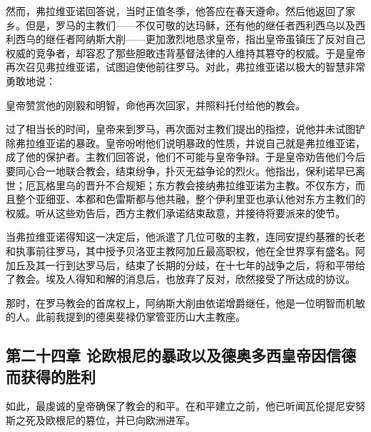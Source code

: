 然而，弗拉维亚诺回答说，当时正值冬季，他答应在春天遵命。然后他返回了家乡。但是，罗马的主教们——不仅可敬的达玛稣，还有他的继任者西利西乌以及西利西乌的继任者阿纳斯大削——更加激烈地恳求皇帝，指出皇帝虽镇压了反对自己权威的竞争者，却容忍了那些胆敢违背基督法律的人维持其篡夺的权威。于是皇帝再次召见弗拉维亚诺，试图迫使他前往罗马。对此，弗拉维亚诺以极大的智慧非常勇敢地说：\par

皇帝赞赏他的刚毅和明智，命他再次回家，并照料托付给他的教会。\par

过了相当长的时间，皇帝来到罗马，再次面对主教们提出的指控，说他并未试图铲除弗拉维亚诺的暴政。皇帝吩咐他们说明暴政的性质，并说自己就是弗拉维亚诺，成了他的保护者。主教们回答说，他们不可能与皇帝争辩。于是皇帝劝告他们今后要同心合一地联合教会，结束纷争，扑灭无益争论的烈火。他指出，保利诺早已离世；厄瓦格里乌的晋升不合规矩；东方教会接纳弗拉维亚诺为主教。不仅东方，而且整个亚细亚、本都和色雷斯都与他共融，整个伊利里亚也承认他对东方主教们的权威。听从这些劝告后，西方主教们承诺结束敌意，并接待将要派来的使节。\par

当弗拉维亚诺得知这一决定后，他派遣了几位可敬的主教，连同安提约基雅的长老和执事前往罗马，其中授予贝洛亚主教阿加丘最高职权，他在全世界享有盛名。阿加丘及其一行到达罗马后，结束了长期的分歧，在十七年的战争之后，将和平带给了教会。埃及人得知和解的消息后，也放弃了反对，欣然接受了所达成的协议。\par

那时，在罗马教会的首席权上，阿纳斯大削由依诺增爵继任，他是一位明智而机敏的人。此前我提到的德奥斐禄仍掌管亚历山大主教座。\par


\subsection{第二十四章 论欧根尼的暴政以及德奥多西皇帝因信德而获得的胜利}

如此，最虔诚的皇帝确保了教会的和平。在和平建立之前，他已听闻瓦伦提尼安努斯之死及欧根尼的篡位，并已向欧洲进军。\par

